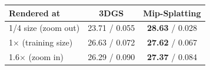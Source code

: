 \begin{tabular}{@{}lcc@{}}\toprule
Rendered at & 3DGS & Mip-Splatting \\\midrule
1/4 size (zoom out) & 23.71 / 0.055 & \textbf{28.63} / 0.028 \\
1$\times$ (training size) & 26.63 / 0.072 & \textbf{27.62} / 0.067 \\
1.6$\times$ (zoom in) & 26.29 / 0.090 & \textbf{27.37} / 0.084 \\
\bottomrule\end{tabular}
